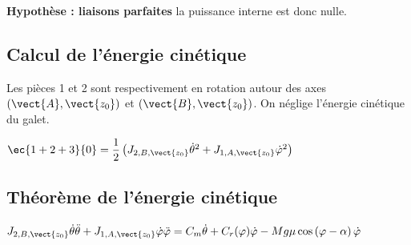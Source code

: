 \textbf{Hypothèse : liaisons parfaites} la puissance interne est donc nulle.

\subsection{Calcul de l'énergie cinétique}

Les pièces 1 et 2 sont respectivement en rotation autour des axes $\left(\vect{A},\vect{z_0}\right)$ et $\left(\vect{B},\vect{z_0}\right)$.
On néglige l'énergie cinétique du galet.

$\ec{1+2+3}{0}=\dfrac{1}{2}\left(J_{2,B,\vect{z_0}} \dot{\theta}^2+J_{1,A,\vect{z_0}} \dot{\varphi}^2\right)$

\subsection{Théorème de l'énergie cinétique}

$J_{2,B,\vect{z_0}} \dot{\theta}\ddot{\theta}+J_{1,A,\vect{z_0}} \dot{\varphi}\ddot{\varphi}=C_m \dot{\theta}+C_r(\varphi) \dot{\varphi}-Mg\mu\cos\left(\varphi -\alpha\right)  \dot{\varphi}
$

\begin{thebibliography}{2}
\end{thebibliography}






